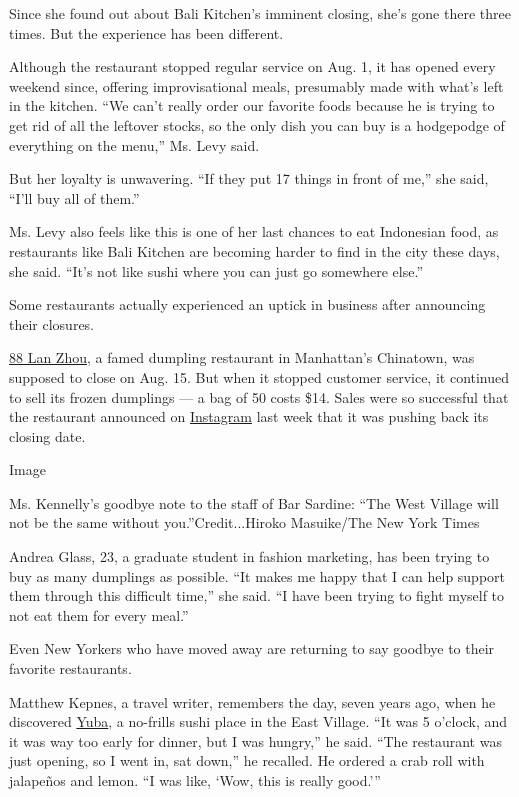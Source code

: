 Since she found out about Bali Kitchen's imminent closing, she's gone
there three times. But the experience has been different.

Although the restaurant stopped regular service on Aug. 1, it has opened
every weekend since, offering improvisational meals, presumably made
with what's left in the kitchen. ``We can't really order our favorite
foods because he is trying to get rid of all the leftover stocks, so the
only dish you can buy is a hodgepodge of everything on the menu,'' Ms.
Levy said.

But her loyalty is unwavering. ``If they put 17 things in front of me,''
she said, ``I'll buy all of them.''

Ms. Levy also feels like this is one of her last chances to eat
Indonesian food, as restaurants like Bali Kitchen are becoming harder to
find in the city these days, she said. ``It's not like sushi where you
can just go somewhere else.''

Some restaurants actually experienced an uptick in business after
announcing their closures.

\href{https://www.instagram.com/88lanzhou/}{88 Lan Zhou}, a famed
dumpling restaurant in Manhattan's Chinatown, was supposed to close on
Aug. 15. But when it stopped customer service, it continued to sell its
frozen dumplings --- a bag of 50 costs \$14. Sales were so successful
that the restaurant announced on
\href{https://www.instagram.com/p/CDxcFdAjU3I/}{Instagram} last week
that it was pushing back its closing date.

Image

Ms. Kennelly's goodbye note to the staff of Bar Sardine: ``The West
Village will not be the same without you.''Credit...Hiroko Masuike/The
New York Times

Andrea Glass, 23, a graduate student in fashion marketing, has been
trying to buy as many dumplings as possible. ``It makes me happy that I
can help support them through this difficult time,'' she said. ``I have
been trying to fight myself to not eat them for every meal.''

Even New Yorkers who have moved away are returning to say goodbye to
their favorite restaurants.

Matthew Kepnes, a travel writer, remembers the day, seven years ago,
when he discovered \href{https://www.yubarestaurant.com/}{Yuba}, a
no-frills sushi place in the East Village. ``It was 5 o'clock, and it
was way too early for dinner, but I was hungry,'' he said. ``The
restaurant was just opening, so I went in, sat down,'' he recalled. He
ordered a crab roll with jalapeños and lemon. ``I was like, `Wow, this
is really good.'''


